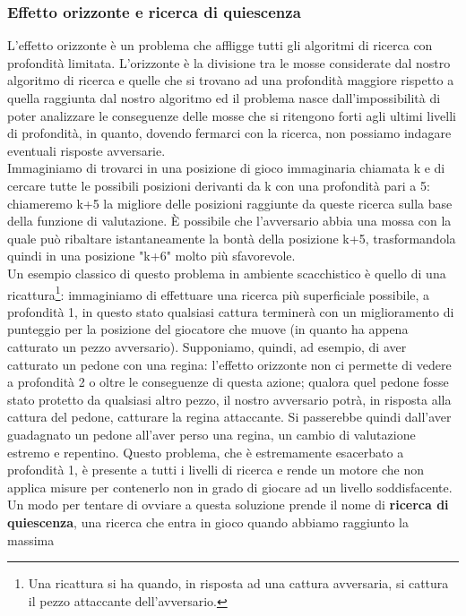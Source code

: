 \subsubsection{Effetto orizzonte e ricerca di quiescenza}
L'effetto orizzonte è un problema che affligge tutti gli algoritmi di ricerca con profondità limitata. L'orizzonte è la divisione 
tra le mosse considerate dal nostro algoritmo di ricerca e quelle che si trovano ad una profondità maggiore rispetto a quella raggiunta dal nostro algoritmo 
ed il problema nasce dall'impossibilità di poter analizzare le conseguenze delle mosse che si ritengono forti agli ultimi livelli di profondità, in quanto, dovendo fermarci con la ricerca,
non possiamo indagare eventuali risposte avversarie.\\
Immaginiamo di trovarci in una posizione di gioco immaginaria chiamata k e di cercare tutte le possibili posizioni derivanti da k con una profondità pari a 5:
chiameremo k+5 la migliore delle posizioni raggiunte da queste ricerca sulla base della funzione di valutazione. È possibile che
l'avversario abbia una mossa con la quale può ribaltare istantaneamente la bontà della posizione k+5, trasformandola quindi in una posizione
"k+6" molto più sfavorevole.\\
Un esempio classico di questo problema in ambiente scacchistico è quello di una ricattura\footnote{Una ricattura si ha quando, in risposta ad una cattura avversaria, si cattura il pezzo attaccante dell'avversario.}: immaginiamo 
di effettuare una ricerca più superficiale possibile, a profondità 1, in questo stato qualsiasi cattura terminerà con un miglioramento di punteggio 
per la posizione del giocatore che muove (in quanto ha appena catturato un pezzo avversario). Supponiamo, quindi, ad esempio, di aver catturato un pedone con una regina:
l'effetto orizzonte non ci permette di vedere a profondità 2 o oltre le conseguenze di questa azione; qualora quel pedone fosse stato 
protetto da qualsiasi altro pezzo, il nostro avversario potrà, in risposta alla cattura del pedone, catturare la regina attaccante.
Si passerebbe quindi dall'aver guadagnato un pedone all'aver perso una regina, un cambio di valutazione estremo e repentino. Questo problema, che è estremamente esacerbato a profondità 1, è presente a tutti i livelli di ricerca e rende un motore che non applica misure per contenerlo 
non in grado di giocare ad un livello soddisfacente. 
\\Un modo per tentare di ovviare a questa soluzione prende il nome di \textbf{ricerca di quiescenza}, una ricerca che entra in gioco quando abbiamo raggiunto la massima 
